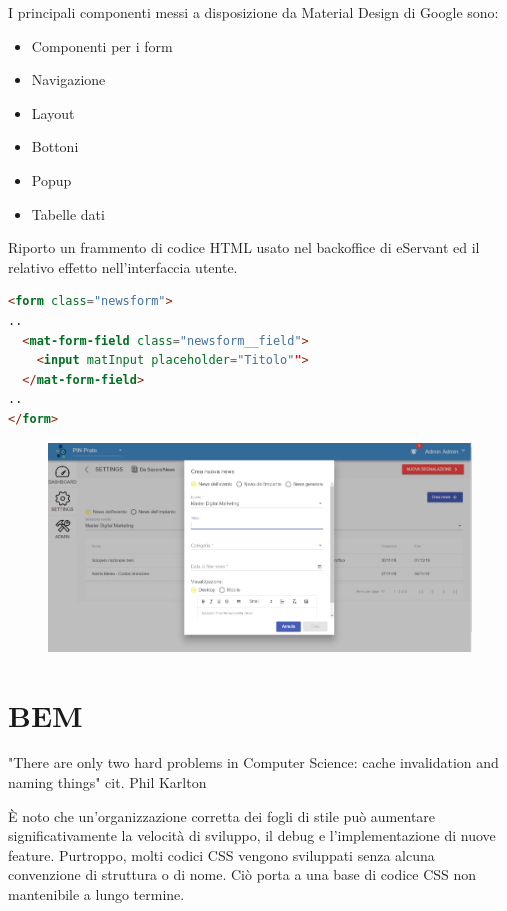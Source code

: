 I principali componenti messi a disposizione da Material Design di Google sono:

\begin{itemize}
    \item Componenti per i form
    \item Navigazione
    \item Layout
    \item Bottoni
    \item Popup
    \item Tabelle dati
\end{itemize}

Riporto un frammento di codice HTML usato nel backoffice di eServant ed il relativo effetto
nell'interfaccia utente.

\begin{lstlisting}[language=html]
<form class="newsform">
..
  <mat-form-field class="newsform__field">
    <input matInput placeholder="Titolo"">
  </mat-form-field>
..
</form>
\end{lstlisting}

\begin{figure}[H]
    \centering  
    \includegraphics[scale=0.4]{img/cap3/backoffice-form}
\end{figure}

\section{BEM}
"There are only two hard problems in Computer Science: cache invalidation and naming things" cit. Phil Karlton

È noto che un'organizzazione corretta dei fogli di stile può aumentare significativamente la velocità
di sviluppo, il debug e l'implementazione di nuove feature. Purtroppo, molti codici CSS vengono
sviluppati senza alcuna convenzione di struttura o di nome. Ciò porta a una base di codice CSS 
non mantenibile a lungo termine.

